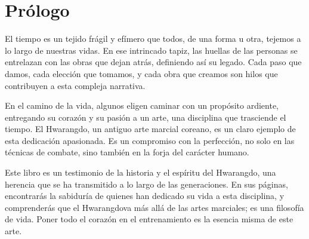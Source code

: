 %
%
%

\chapter{Prólogo}
El tiempo es un tejido frágil y efímero que todos, de una forma u otra, tejemos a lo largo de nuestras vidas. En ese intrincado tapiz, las huellas de las personas se entrelazan con las obras que dejan atrás, definiendo así su legado. Cada paso que damos, cada elección que tomamos, y cada obra que creamos son hilos que contribuyen a esta compleja narrativa.

En el camino de la vida, algunos eligen caminar con un propósito ardiente, entregando su corazón y su pasión a un arte, una disciplina que trasciende el tiempo. El Hwarangdo\textregistered, un antiguo arte marcial coreano, es un claro ejemplo de esta dedicación apasionada. Es un compromiso con la perfección, no solo en las técnicas de combate, sino también en la forja del carácter humano.

Este libro es un testimonio de la historia y el espíritu del Hwarangdo\textregistered, una herencia que se ha transmitido a lo largo de las generaciones. En sus páginas, encontrarás la sabiduría de quienes han dedicado su vida a esta disciplina, y comprenderás que el Hwarangdo\textregistered va más allá de las artes marciales; es una filosofía de vida. Poner todo el corazón en el entrenamiento es la esencia misma de este arte.

